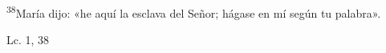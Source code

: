 \documentclass[../../rosario.tex]{subfiles}
\begin{document}
    \textsuperscript{38}María dijo: «he aquí la esclava del Señor; hágase en mí según tu palabra».
    \begin{flushright}
    Lc. 1, 38
    \end{flushright}
\end{document}
